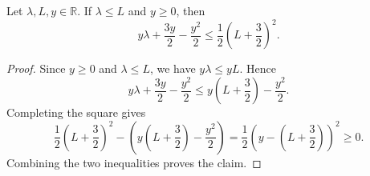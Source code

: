 \begin{helper}
Let \(\lambda,L,y\in\mathbb R\). If \(\lambda\le L\) and \(y\ge0\), then
\[
  y\lambda+\frac{3y}{2}-\frac{y^2}{2}
  \le
  \frac12\left(L+\frac32\right)^2.
\]
\end{helper}
\begin{proof}
Since \(y\ge0\) and \(\lambda\le L\), we have \(y\lambda\le yL\). Hence
\[
  y\lambda+\frac{3y}{2}-\frac{y^2}{2}
  \le
  y\left(L+\frac32\right)-\frac{y^2}{2}.
\]
Completing the square gives
\[
  \frac12\left(L+\frac32\right)^2
  -\left(y\left(L+\frac32\right)-\frac{y^2}{2}\right)
  =
  \frac12\left(y-\left(L+\frac32\right)\right)^2
  \ge0.
\]
Combining the two inequalities proves the claim.
\end{proof}
